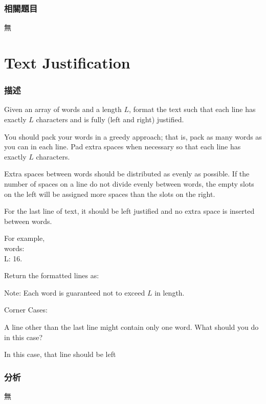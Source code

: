 \subsubsection{相關題目}
\begindot
\item 無
\myenddot


\section{Text Justification} %
\label{sec:text-justification}


\subsubsection{描述}
Given an array of words and a length $L$, format the text such that each line has exactly $L$ characters and is fully (left and right) justified.

You should pack your words in a greedy approach; that is, pack as many words as you can in each line. Pad extra spaces  when necessary so that each line has exactly $L$ characters.

Extra spaces between words should be distributed as evenly as possible. If the number of spaces on a line do not divide evenly between words, the empty slots on the left will be assigned more spaces than the slots on the right.

For the last line of text, it should be left justified and no extra space is inserted between words.

For example, \\
words:  \\
L: 16.

Return the formatted lines as:
\begin{Code}
\end{Code}

Note: Each word is guaranteed not to exceed $L$ in length.

Corner Cases:
\begindot
\item A line other than the last line might contain only one word. What should you do in this case?
\item In this case, that line should be left
\myenddot


\subsubsection{分析}
無


